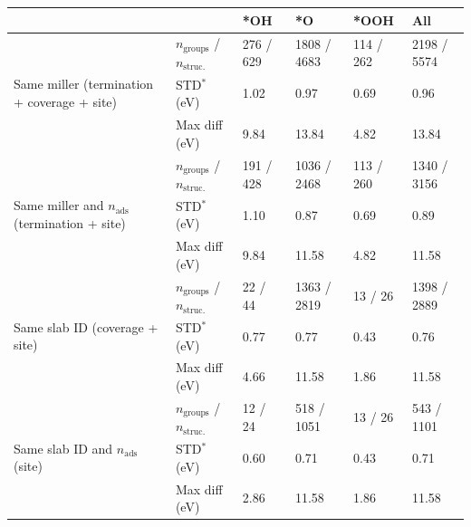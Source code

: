 \begin{tabular}{llllll}
\toprule
 &  & *OH & *O & *OOH & All \\
\midrule
\multirow[t]{3}{*}{Same miller (termination + coverage + site)} & $n_{\text{groups}}$ / $n_{\text{struc.}}$ & 276 / 629 & 1808 / 4683 & 114 / 262 & 2198 / 5574 \\
 & STD$^*$ (eV) & 1.02 & 0.97 & 0.69 & 0.96 \\
 & Max diff (eV) & 9.84 & 13.84 & 4.82 & 13.84 \\
\cline{1-6}
\multirow[t]{3}{*}{Same miller and $n_\text{ads}$ (termination + site)} & $n_{\text{groups}}$ / $n_{\text{struc.}}$ & 191 / 428 & 1036 / 2468 & 113 / 260 & 1340 / 3156 \\
 & STD$^*$ (eV) & 1.10 & 0.87 & 0.69 & 0.89 \\
 & Max diff (eV) & 9.84 & 11.58 & 4.82 & 11.58 \\
\cline{1-6}
\multirow[t]{3}{*}{Same slab ID (coverage + site)} & $n_{\text{groups}}$ / $n_{\text{struc.}}$ & 22 / 44 & 1363 / 2819 & 13 / 26 & 1398 / 2889 \\
 & STD$^*$ (eV) & 0.77 & 0.77 & 0.43 & 0.76 \\
 & Max diff (eV) & 4.66 & 11.58 & 1.86 & 11.58 \\
\cline{1-6}
\multirow[t]{3}{*}{Same slab ID and $n_\text{ads}$ (site)} & $n_{\text{groups}}$ / $n_{\text{struc.}}$ & 12 / 24 & 518 / 1051 & 13 / 26 & 543 / 1101 \\
 & STD$^*$ (eV) & 0.60 & 0.71 & 0.43 & 0.71 \\
 & Max diff (eV) & 2.86 & 11.58 & 1.86 & 11.58 \\
\cline{1-6}
\bottomrule
\end{tabular}
